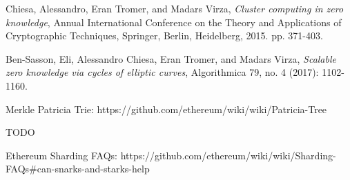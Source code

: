 \documentclass{article}
\begin{document}
\begin{thebibliography}{9}
	
	Chiesa, Alessandro, Eran Tromer, and Madars Virza,
	\textit{Cluster computing in zero knowledge},
	Annual International Conference on the Theory and Applications of Cryptographic Techniques, Springer, Berlin, Heidelberg, 2015. pp. 371-403.
	
	Ben-Sasson, Eli, Alessandro Chiesa, Eran Tromer, and Madars Virza,
	\textit{Scalable zero knowledge via cycles of elliptic curves}, Algorithmica 79, no. 4 (2017): 1102-1160.
	
	Merkle Patricia Trie: https://github.com/ethereum/wiki/wiki/Patricia-Tree
	
	TODO
	
	Ethereum Sharding FAQs: https://github.com/ethereum/wiki/wiki/Sharding-FAQs\#can-snarks-and-starks-help
	
	
\end{thebibliography}
		
\end{document}

